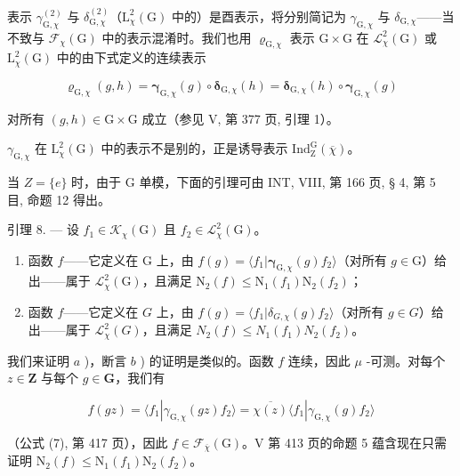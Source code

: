  表示 \(\gamma_{\mathrm{G},\chi}^{(2)}\) 与 \(\delta_{\mathrm{G},\chi}^{(2)}\)（\(\mathrm{L}_{\chi}^{2}(\mathrm{G})\) 中的）是酉表示，将分别简记为 \(\gamma_{\mathrm{G},\chi}\) 与 \(\delta_{\mathrm{G},\chi}\)——当不致与 \(\mathcal{F}_{\chi}(\mathrm{G})\) 中的表示混淆时。我们也用 \(\varrho_{\mathrm{G},\chi}\) 表示 \(\mathrm{G} \times \mathrm{G}\) 在 \(\mathcal{L}_{\chi}^{2}(\mathrm{G})\) 或 \(\mathrm{L}_{\chi}^{2}(\mathrm{G})\) 中的由下式定义的连续表示

\[
\pmb {\varrho} _ {\mathrm{G}, \chi} (g, h) = \pmb {\gamma} _ {\mathrm{G}, \chi} (g) \circ \pmb {\delta} _ {\mathrm{G}, \chi} (h) = \pmb {\delta} _ {\mathrm{G}, \chi} (h) \circ \pmb {\gamma} _ {\mathrm{G}, \chi} (g)
\]

对所有 \((g,h)\in \mathrm{G}\times \mathrm{G}\) 成立（参见 V, 第 377 页, 引理 1）。

\(\gamma_{\mathrm{G},\chi}\) 在 \(\mathrm{L}_{\chi}^{2}(\mathrm{G})\) 中的表示不是别的，正是诱导表示 \(\mathrm{Ind}_{\mathrm{Z}}^{\mathrm{G}}(\overline{\chi})\)。

当 \(Z = \{e\}\) 时，由于 G 单模，下面的引理可由 INT, VIII, 第 166 页, § 4, 第 5 目, 命题 12 得出。

引理 8. --- 设 \(f_1 \in \mathcal{K}_\chi(\mathrm{G})\) 且 \(f_2 \in \mathcal{L}_\chi^2(\mathrm{G})\)。

\begin{enumerate}
\def\labelenumi{\alph{enumi})}
\item
  函数 \(f\)——它定义在 \(\mathrm{G}\) 上，由 \(f(g) = \langle f_1 | \boldsymbol{\gamma}_{\mathrm{G},\chi}(g)f_2 \rangle\)（对所有 \(g \in \mathrm{G}\)）给出——属于 \(\mathcal{L}_{\chi}^{2}(\mathrm{G})\)，且满足 \(\mathrm{N}_2(f) \leqslant \mathrm{N}_1(f_1)\mathrm{N}_2(f_2)\)；
\item
  函数 \(f\)——它定义在 \(G\) 上，由 \(f(g) = \langle f_1 | \delta_{G,\chi}(g)f_2 \rangle\)（对所有 \(g \in G\)）给出——属于 \(\mathcal{L}_{\chi}^{2}(G)\)，且满足 \(N_2(f) \leqslant N_1(f_1)N_2(f_2)\)。
\end{enumerate}

我们来证明 \(a\) )，断言 \(b\) ) 的证明是类似的。函数 \(f\) 连续，因此 \(\mu\) -可测。对每个 \(z \in \mathbf{Z}\) 与每个 \(g \in \mathbf{G}\)，我们有

\[
f (g z) = \langle f _ {1} | \gamma_ {\mathrm{G}, \chi} (g z) f _ {2} \rangle = \overline {{\chi (z)}} \langle f _ {1} | \gamma_ {\mathrm{G}, \chi} (g) f _ {2} \rangle
\]

（公式 (7), 第 417 页），因此 \(f \in \mathcal{F}_{\overline{\chi}}(\mathrm{G})\)。V 第 413 页的命题 5 蕴含现在只需证明 \(\mathrm{N}_2(f) \leqslant \mathrm{N}_1(f_1)\mathrm{N}_2(f_2)\)。

